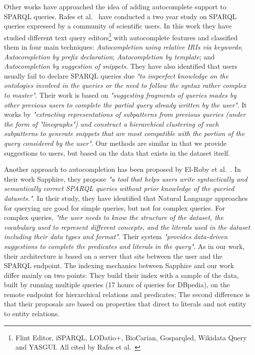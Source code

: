 Other works have approached the idea of adding autocomplete support to SPARQL queries. 
Rafes et al.~\cite{Rafes2018} have conducted a two year study on SPARQL queries expressed by a community of scientific users. 
In this work they have studied different text query editors\footnote{Flint Editor, iSPARQL, LODatio+, BioCarian, Gosparqled, Wikidata Query and YASGUI. All cited by Rafes et al.~\cite{Rafes2018}} with autocomplete features and classified them in four main techniques: 
\textit{Autocompletion using relative IRIs via keywords}; 
\textit{Autocompletion by prefix declaration}; 
\textit{Autocompletion by template}; and 
\textit{Autocompletion by suggestion of snippets}. 
They have also identified that users usually fail to declare SPARQL queries due \textit{"to imperfect knowledge on the ontologies involved in the queries or the need to follow the syntax rather complex to master"}. 
Their work is based on \textit{"suggesting fragments of queries mades by other previous users to complete the partial query already written by the user"}. 
It works by \textit{"extracting representations of subpatterns from previous queries (under the form of "linegraphs") and construct a hierarchical clustering of such subpatterns to generate snippets that are most compatible with the portion of the query considered by the user"}. Our methods are similar in that we provide suggestions to users, but based on the data that exists in the dataset itself.

Another approach to autocompletion has been proposed by El-Roby et al.~\cite{El-Roby2016}. 
In their work Sapphire, they propose \textit{"a tool that helps users write syntactically and semantically correct SPARQL queries without prior knowledge of the queried datasets."}. 
In their study, they have identified that Natural Language approaches for querying are good for simple queries, but not for complex queries. 
For complex queries, \textit{"the user needs to know the structure of the dataset, the vocabulary used to represent different concepts, and the literals used in the dataset including their data types and format"}.
Their system \textit{"provides data-driven suggestions to complete the predicates and literals in the query"}. 
As in our work, their architecture is based on a server that sits between the user and the SPARQL endpoint.
The indexing mechanics between Sapphire and our work differ mainly on two points: 
They build their index with a sample of the data, built by running multiple queries (17 hours of queries for DBpedia), on the remote endpoint for hierarchical relations and predicates; 
The second difference is that their proposals are based on properties that direct to literals and not entity to entity relations.

